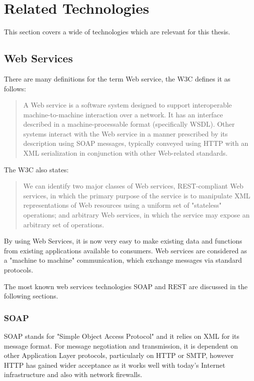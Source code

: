 \section{Related Technologies\label{sec:back_rel_tech}}
This section covers a wide of technologies which are relevant for this thesis.	

\subsection{Web Services\label{sec:back_tech_ws}}

There are many definitions for the term Web service, the \ac{W3C} defines it as follows:\cite{W3C}\\
\begin{quote}
A Web service is a software system designed to support interoperable machine-to-machine interaction over a network. It has an interface described in a machine-processable format (specifically \ac{WSDL}). Other systems interact with the Web service in a manner prescribed by its description using \ac{SOAP} messages, typically conveyed using \ac{HTTP} with an \ac{XML} serialization in conjunction with other Web-related standards.
\end{quote}

The \ac{W3C} also states:\cite{W3C} 
\begin{quote}
We can identify two major classes of Web services, \ac{REST}-compliant Web services, in which the primary purpose of the service is to manipulate \ac{XML} representations of Web resources using a uniform set of "stateless" operations; and arbitrary Web services, in which the service may expose an arbitrary set of operations.
\end{quote}

By using Web Services, it is now very easy to make existing data and functions from existing applications available to consumers. Web services are considered as a "machine to machine" communication, which  exchange messages via standard protocols.

The most known web services technologies \ac{SOAP} and \ac{REST} are discussed in the following sections.

\subsubsection{SOAP\label{sec:back_tech_ws_soap}}
\ac{SOAP} stands for "Simple Object Access Protocol" and it relies on  \ac{XML} for its message format. For message negotiation and transmission, it is dependent on other Application Layer protocols, particularly on \ac{HTTP} or  \ac{SMTP}, however \ac{HTTP} has gained wider acceptance as it works well with today's Internet infrastructure and also with network firewalls.

